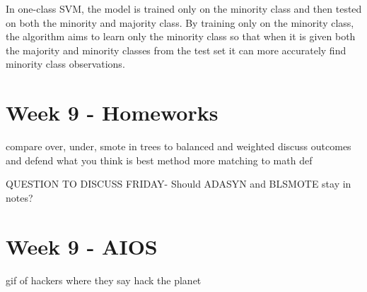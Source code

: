 \documentclass[a4paper]{article}
\begin{document}
In one-class SVM, the model is trained only on the minority class and then tested on both the minority and majority class. By training only on the minority class, the algorithm aims to learn only the minority class so that when it is given both the majority and minority classes from the test set it can more accurately find minority class observations.%


\section{Week 9 - Homeworks}
compare over, under, smote in trees to balanced and weighted discuss outcomes and defend what you think is best method
more matching to math def

QUESTION TO DISCUSS FRIDAY- Should ADASYN and BLSMOTE stay in notes? 

\section{Week 9 - AIOS}
gif of hackers where they say hack the planet
\end{document}
